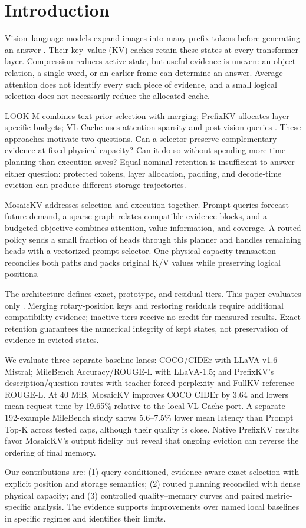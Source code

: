 \section{Introduction}
\label{sec:introduction}
Vision--language models expand images into many prefix tokens before generating
an answer \citep{liu2023llava,liu2024improved,bai2025qwen}. Their key--value
(KV) caches retain these states at every transformer layer. Compression reduces
active state, but useful evidence is uneven: an object relation, a single
word, or an earlier frame can determine an answer. Average attention does not
identify every such piece of evidence, and a small logical selection does
not necessarily reduce the allocated cache.

LOOK-M combines text-prior selection with merging; PrefixKV allocates
layer-specific budgets; VL-Cache uses attention sparsity and post-vision
queries \citep{wan2024lookm,wang2025prefixkv,tu2025vlcache}. These approaches
motivate two questions. Can a selector preserve complementary evidence at
fixed physical capacity? Can it do so without spending more time planning
than execution saves? Equal nominal retention is insufficient to answer
either question: protected tokens, layer allocation, padding, and decode-time
eviction can produce different storage trajectories.

MosaicKV addresses selection and execution together. Prompt queries forecast
future demand, a sparse graph relates compatible evidence blocks, and a
budgeted objective combines attention, value information, and coverage.
A routed policy sends a small fraction of heads through this planner and
handles remaining heads with a vectorized prompt selector. One physical
capacity transaction reconciles both paths and packs original K/V values
while preserving logical positions.

The architecture defines exact, prototype, and residual tiers. This paper
evaluates only \mexact. Merging rotary-position keys and restoring residuals
require additional compatibility evidence; inactive tiers receive no credit
for measured results. Exact retention guarantees the numerical integrity of
kept states, not preservation of evidence in evicted states.

We evaluate three separate baseline lanes: COCO/CIDEr with LLaVA-v1.6-Mistral;
MileBench Accuracy/ROUGE-L with LLaVA-1.5; and PrefixKV's description/question
routes with teacher-forced perplexity and FullKV-reference ROUGE-L.
At 40 MiB, MosaicKV improves COCO CIDEr by 3.64 and lowers mean request time
by 19.65\% relative to the local VL-Cache port. A separate 192-example
MileBench study shows 5.6--7.5\% lower mean latency than Prompt Top-K across
tested caps, although their quality is close. Native PrefixKV results favor
MosaicKV's output fidelity but reveal that ongoing eviction can reverse the
ordering of final memory.

Our contributions are: (1) query-conditioned, evidence-aware exact selection
with explicit position and storage semantics; (2) routed planning reconciled
with dense physical capacity; and (3) controlled quality--memory curves and
paired metric-specific analysis. The evidence supports improvements over
named local baselines in specific regimes and identifies their limits.
